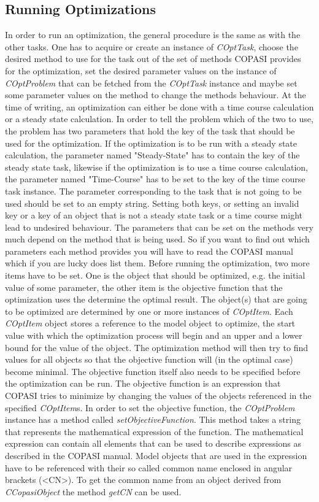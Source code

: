 \documentclass[a4,10pt]{article}
\begin{document}
\subsection{Running Optimizations}
In order to run an optimization, the general procedure is the same as with the other tasks. One has to acquire or create an instance of \textit{COptTask}, choose the desired method to use for the task out of the set of methods COPASI provides for the optimization, set the desired parameter values on the instance of \textit{COptProblem} that can be fetched from the \textit{COptTask} instance and maybe set some parameter values on the method to change the methods behaviour.
At the time of writing, an optimization can either be done with a time course calculation or a steady state calculation. In order to tell the problem which of the two to use, the problem has two parameters that hold the key of the task that should be used for the optimization. If the optimization is to be run with a steady state calculation, the parameter named "Steady-State" has to contain the key of the steady state task, likewise if the optimization is to use a time course calculation, the parameter named "Time-Course" has to be set to the key of the time course task instance. The parameter corresponding to the task that is not going to be used should be set to an empty string. Setting both keys, or setting an invalid key or a key of an object that is not a steady state task or a time course might lead to undesired behaviour.
The parameters that can be set on the methods very much depend on the method that is being used. So if you want to find out which parameters each method provides you will have to read the COPASI manual which if you are lucky does list them.
Before running the optimization, two more items have to be set. One is the object that should be optimized, e.g. the initial value of some parameter, the other item is the objective function that the optimization uses the determine the optimal result.
The object(s) that are going to be optimized are determined by one or more instances of \textit{COptItem}. Each \textit{COptItem} object stores a reference to the model object to optimize, the start value with which the optimization process will begin and an upper and a lower bound for the value of the object. The optimization method will then try to find values for all objects so that the objective function will (in the optimal case) become minimal.
The objective function itself also needs to be specified before the optimization can be run. The objective function is an expression that COPASI tries to minimize by changing the values of the objects referenced in the specified \textit{COptItem}s. In order to set the objective function, the \textit{COptProblem} instance has a method called \textit{setObjectiveFunction}. This method takes a string that represents the mathematical expression of the function. The mathematical expression can contain all elements that can be used to describe expressions as described in the COPASI manual. Model objects that are used in the expression have to be referenced with their so called common name enclosed in angular brackets (<CN>). To get the common name from an object derived from \textit{CCopasiObject} the method \textit{getCN} can be used.
\end{document}
